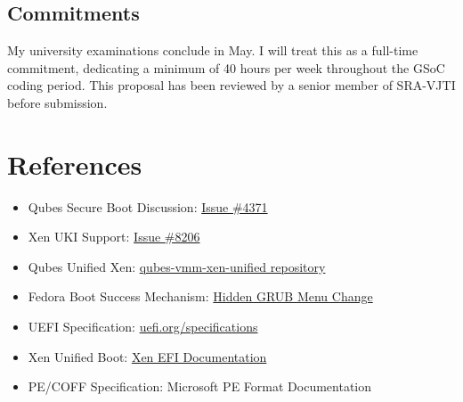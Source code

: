 \documentclass[12pt, a4paper]{article}
\begin{document}
\subsection*{Commitments}

My university examinations conclude in May. I will treat this as a full-time commitment, dedicating a minimum of 40 hours per week throughout the GSoC coding period. This proposal has been reviewed by a senior member of SRA-VJTI before submission.

\section{References}

\begin{itemize}
    \item Qubes Secure Boot Discussion: \href{https://github.com/QubesOS/qubes-issues/issues/4371}{Issue \#4371}
    \item Xen UKI Support: \href{https://github.com/QubesOS/qubes-issues/issues/8206}{Issue \#8206}
    \item Qubes Unified Xen: \href{https://github.com/QubesOS/qubes-vmm-xen-unified}{qubes-vmm-xen-unified repository}
    \item Fedora Boot Success Mechanism: \href{https://fedoraproject.org/wiki/Changes/HiddenGrubMenu}{Hidden GRUB Menu Change}
    \item UEFI Specification: \href{https://uefi.org/specifications}{uefi.org/specifications}
    \item Xen Unified Boot: \href{https://xenbits.xen.org/docs/unstable/misc/efi.html}{Xen EFI Documentation}
    \item PE/COFF Specification: Microsoft PE Format Documentation
\end{itemize}
\end{document}
